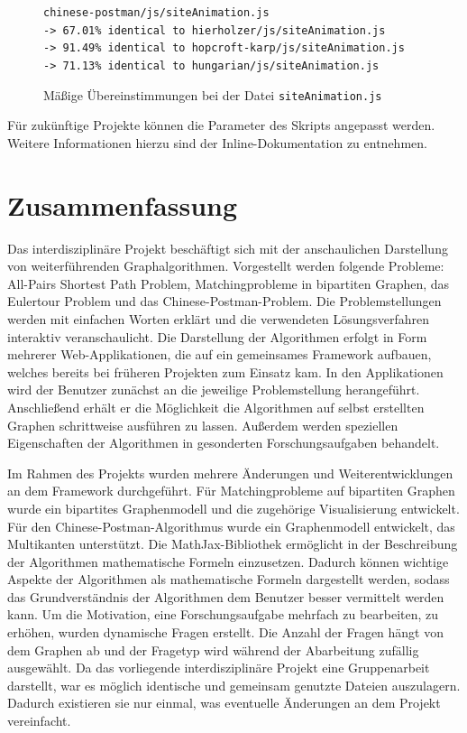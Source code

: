 \begin{figure}[h!]
\noindent\texttt{chinese-postman/js/siteAnimation.js \\
-> 67.01\% identical to hierholzer/js/siteAnimation.js \\
-> 91.49\% identical to hopcroft-karp/js/siteAnimation.js \\
-> 71.13\% identical to hungarian/js/siteAnimation.js
}
\caption[Gemeinsame Dateien, Beispiel 2]{Mäßige Übereinstimmungen bei der Datei \texttt{siteAnimation.js}}\label{fig:shared-files-2}
\end{figure}

Für zukünftige Projekte können die Parameter des Skripts angepasst werden. Weitere Informationen hierzu sind der Inline-Dokumentation zu entnehmen.

\chapter{Zusammenfassung}
Das interdisziplinäre Projekt beschäftigt sich mit der anschaulichen Darstellung von weiterführenden Graphalgorithmen. Vorgestellt werden folgende Probleme: All-Pairs Shortest Path Problem, Matchingprobleme in bipartiten Graphen, das Eulertour Problem und das Chinese-Postman-Problem. 
Die Problemstellungen werden mit einfachen Worten erklärt und die verwendeten Lösungsverfahren interaktiv veranschaulicht. Die Darstellung der Algorithmen erfolgt in Form mehrerer Web-Applikationen, die auf ein gemeinsames Framework aufbauen, welches bereits bei früheren Projekten zum Einsatz kam. In den Applikationen wird der Benutzer zunächst an die jeweilige Problemstellung herangeführt. Anschließend erhält er die Möglichkeit die Algorithmen auf selbst erstellten Graphen schrittweise ausführen zu lassen. Außerdem werden speziellen Eigenschaften der Algorithmen in gesonderten Forschungsaufgaben behandelt. 

Im Rahmen des Projekts wurden mehrere Änderungen und Weiterentwicklungen an dem Framework durchgeführt. Für Matchingprobleme auf bipartiten Graphen wurde ein bipartites Graphenmodell und die zugehörige Visualisierung entwickelt. Für den Chinese-Postman-Algorithmus wurde ein Graphenmodell entwickelt, das Multikanten unterstützt. 
Die MathJax-Bibliothek ermöglicht in der Beschreibung der Algorithmen mathematische Formeln einzusetzen. Dadurch können wichtige Aspekte der Algorithmen als mathematische Formeln dargestellt werden, sodass das Grundverständnis der Algorithmen dem Benutzer besser vermittelt werden kann.
Um die Motivation, eine Forschungsaufgabe mehrfach zu bearbeiten, zu erhöhen, wurden dynamische Fragen erstellt. Die Anzahl der Fragen hängt von dem Graphen ab und der Fragetyp wird während der Abarbeitung zufällig ausgewählt. Da das vorliegende interdisziplinäre Projekt eine Gruppenarbeit darstellt, war es möglich identische und gemeinsam genutzte Dateien auszulagern. Dadurch existieren sie nur einmal, was eventuelle Änderungen an dem Projekt vereinfacht.
